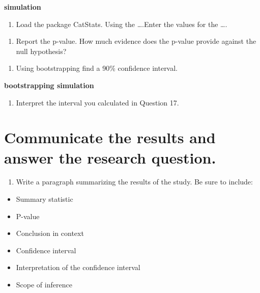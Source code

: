 \documentclass[
]{report}
\providecommand{\tightlist}{%
  \setlength{\itemsep}{0pt}\setlength{\parskip}{0pt}}
\begin{document}
\textbf{simulation}

\begin{enumerate}
\def\labelenumi{\arabic{enumi}.}
\setcounter{enumi}{14}
\tightlist
\item
  Load the package CatStats. Using the \ldots.Enter the values for the \ldots.
\end{enumerate}

\vspace{1in}

\begin{enumerate}
\def\labelenumi{\arabic{enumi}.}
\setcounter{enumi}{15}
\tightlist
\item
  Report the p-value. How much evidence does the p-value provide against the null hypothesis?
\end{enumerate}

\vspace{1in}

\begin{enumerate}
\def\labelenumi{\arabic{enumi}.}
\setcounter{enumi}{16}
\tightlist
\item
  Using bootstrapping find a 90\% confidence interval.
\end{enumerate}

\textbf{bootstrapping simulation}

\begin{enumerate}
\def\labelenumi{\arabic{enumi}.}
\setcounter{enumi}{17}
\tightlist
\item
  Interpret the interval you calculated in Question 17.
\end{enumerate}

\vspace{1in}

\hypertarget{communicate-the-results-and-answer-the-research-question.}{%
\section{Communicate the results and answer the research question.}\label{communicate-the-results-and-answer-the-research-question.}}

\begin{enumerate}
\def\labelenumi{\arabic{enumi}.}
\setcounter{enumi}{18}
\tightlist
\item
  Write a paragraph summarizing the results of the study. Be sure to include:
\end{enumerate}

\begin{itemize}
\item
  Summary statistic
\item
  P-value
\item
  Conclusion in context
\item
  Confidence interval
\item
  Interpretation of the confidence interval
\item
  Scope of inference
\end{itemize}
\end{document}
